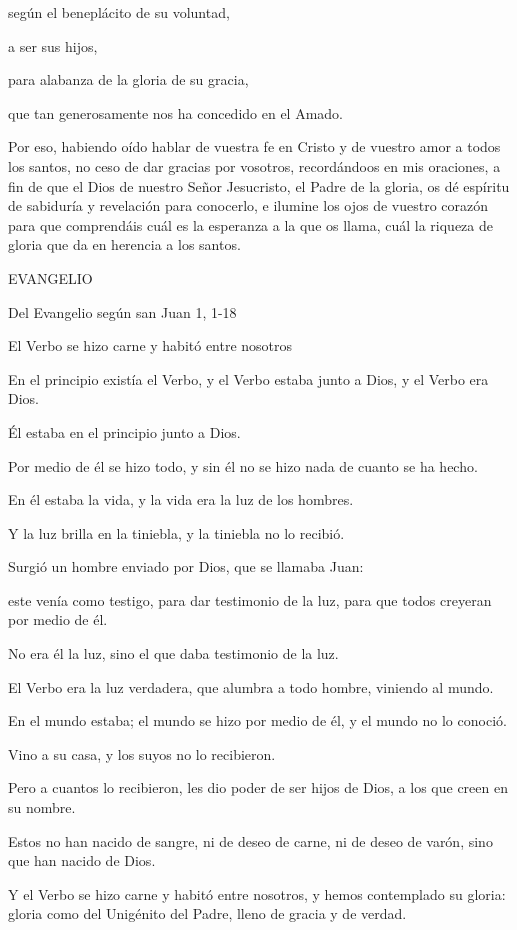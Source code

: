 \begin{body}
\begin{body}
según el beneplácito de su voluntad,

a ser sus hijos,

para alabanza de la gloria de su gracia,

que tan generosamente nos ha concedido en el Amado.

Por eso, habiendo oído hablar de vuestra fe en Cristo y de vuestro amor
a todos los santos, no ceso de dar gracias por vosotros, recordándoos en
mis oraciones, a fin de que el Dios de nuestro Señor Jesucristo, el
Padre de la gloria, os dé espíritu de sabiduría y revelación para
conocerlo, e ilumine los ojos de vuestro corazón para que comprendáis
cuál es la esperanza a la que os llama, cuál la riqueza de gloria que da
en herencia a los santos.

EVANGELIO

Del Evangelio según san Juan 1, 1-18

El Verbo se hizo carne y habitó entre nosotros

En el principio existía el Verbo, y el Verbo estaba junto a Dios, y el
Verbo era Dios.

Él estaba en el principio junto a Dios.

Por medio de él se hizo todo, y sin él no se hizo nada de cuanto se ha
hecho.

En él estaba la vida, y la vida era la luz de los hombres.

Y la luz brilla en la tiniebla, y la tiniebla no lo recibió.

Surgió un hombre enviado por Dios, que se llamaba Juan:

este venía como testigo, para dar testimonio de la luz, para que todos
creyeran por medio de él.

No era él la luz, sino el que daba testimonio de la luz.

El Verbo era la luz verdadera, que alumbra a todo hombre, viniendo al
mundo.

En el mundo estaba; el mundo se hizo por medio de él, y el mundo no lo
conoció.

Vino a su casa, y los suyos no lo recibieron.

Pero a cuantos lo recibieron, les dio poder de ser hijos de Dios, a los
que creen en su nombre.

Estos no han nacido de sangre, ni de deseo de carne, ni de deseo de
varón, sino que han nacido de Dios.

Y el Verbo se hizo carne y habitó entre nosotros, y hemos contemplado su
gloria: gloria como del Unigénito del Padre, lleno de gracia y de
verdad.


\end{body}
\end{body}
